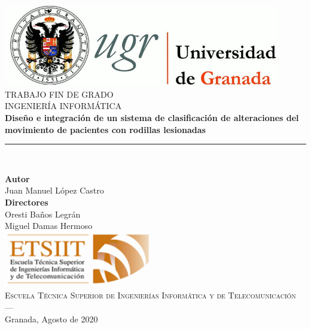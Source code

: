 
\begin{titlepage}
 
\newlength{\centeroffset}
\setlength{\centeroffset}{-0.5\oddsidemargin}
\addtolength{\centeroffset}{0.5\evensidemargin}
\thispagestyle{empty}


\noindent\hspace*{\centeroffset}\begin{minipage}{\textwidth}

\centering
\includegraphics[width=0.9\textwidth]{imagenes/logo_ugr.jpg}\\[1.4cm]

\textsc{ \Large TRABAJO FIN DE GRADO\\[0.2cm]}
\textsc{INGENIERÍA INFORMÁTICA}\\[0.6cm]
% 
{\Huge\bfseries Diseño e integración de un sistema de clasificación de alteraciones del movimiento de pacientes con rodillas lesionadas\\}
\noindent\rule[-1ex]{\textwidth}{3pt}\\[3.5ex]
\end{minipage}

\vspace{0.9cm}
\noindent\hspace*{\centeroffset}\begin{minipage}{\textwidth}
\centering

\textbf{Autor}\\ Juan Manuel López Castro\\[2.5ex]
\textbf{Directores}\\
{ Oresti Baños Legrán \\
Miguel Damas Hermoso}\\[0.25cm]
\includegraphics[width=0.5\textwidth]{imagenes/etsiit_logo.png}\\[0.25cm]
\textsc{Escuela Técnica Superior de Ingenierías Informática y de Telecomunicación}\\
\textsc{---}\\
Granada, Agosto de 2020
\end{minipage}
\end{titlepage}




